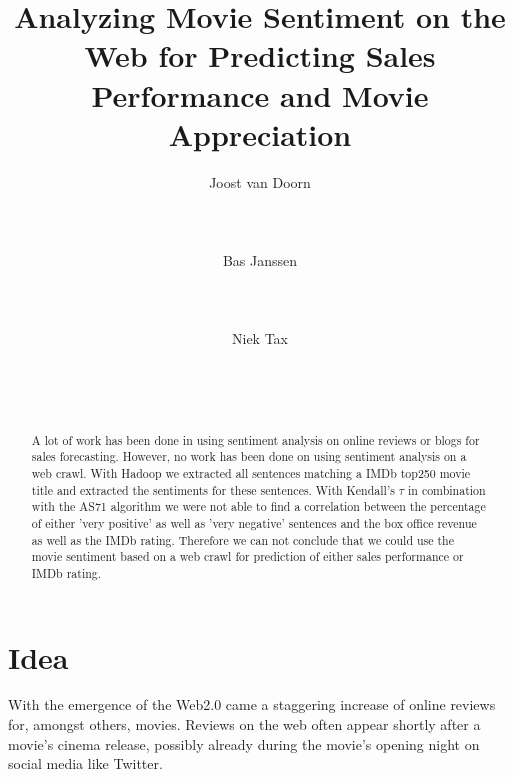 \documentclass{sig-alternate-br}
\begin{document}

\title{Analyzing Movie Sentiment on the Web for Predicting Sales Performance and Movie Appreciation}

\author{
\alignauthor Joost van Doorn\\
       \\
       \\
       \\
\alignauthor Bas Janssen\\
       \\
       \\
       \\
\alignauthor Niek Tax\\
       \\
       \\
       \\
}

\maketitle
\begin{abstract}
A lot of work has been done in using sentiment analysis on online reviews or blogs for sales forecasting. However, no work has been done on using sentiment analysis on a web crawl. With Hadoop we extracted all sentences matching a IMDb top250 movie title and extracted the sentiments for these sentences. With Kendall's $\tau$ in combination with the AS71 algorithm we were not able to find a correlation between the percentage of either 'very positive' as well as 'very negative' sentences and the box office revenue as well as the IMDb rating. Therefore we can not conclude that we could use the movie sentiment based on a web crawl for prediction of either sales performance or IMDb rating.
\end{abstract} 


\section{Idea}
With the emergence of the Web2.0 came a staggering increase of online reviews for, amongst others, movies. Reviews on the web often appear shortly after a movie's cinema release, possibly already during the movie's opening night on social media like Twitter. 
\end{document}
